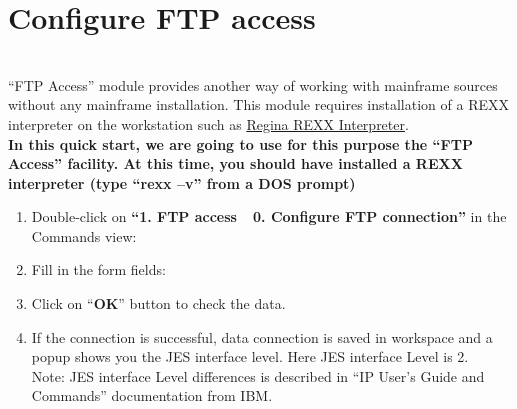 \chapter{Configure FTP access}

\textcolor{red}{}
\\[1.5ex]
``FTP Access'' module provides another way of working with mainframe sources without any mainframe installation. This module requires installation of a REXX interpreter on the workstation such as \href{http://sourceforge.net/projects/regina-rexx/files/regina-rexx/}{Regina REXX Interpreter}.
\\[1.5ex]
\textbf{In this quick start, we are going to use for this purpose the ``FTP Access'' facility. At this time, you should have installed a REXX interpreter (type ``rexx --v'' from a DOS prompt)}
\\
\begin{enumerate}
\item Double-click on \textbf{``1. FTP access~\RHD~0. Configure FTP connection''} in the Commands view:

\item Fill in the form fields:
\item Click on ``\textbf{OK}'' button to check the data.

\item If the connection is successful, data connection is saved in workspace and a popup shows you the JES interface level.
Here JES interface Level is 2.
\\[1.5ex]
Note: JES interface Level differences is described in ``IP User's Guide and Commands'' documentation from IBM.
\end{enumerate}
